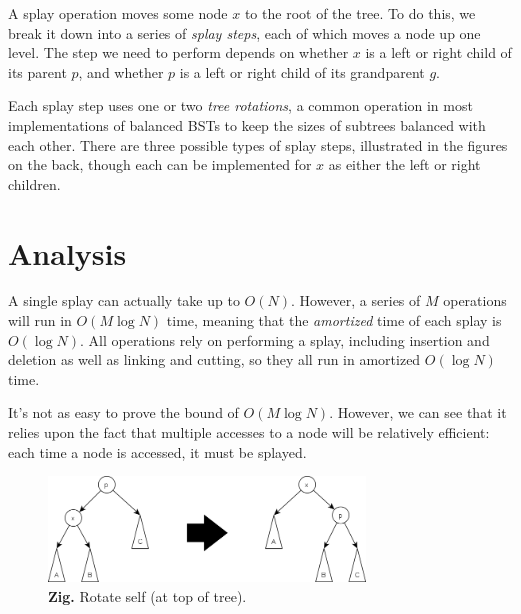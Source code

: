 \documentclass{article}
\begin{document}
A splay operation moves some node $x$ to the root of the tree. To do this, we break it down into a series of \textit{splay steps}, each of which moves a node up one level. The step we need to perform depends on whether $x$ is a left or right child of its parent $p$, and whether $p$ is a left or right child of its grandparent $g$.

Each splay step uses one or two \textit{tree rotations}, a common operation in most implementations of balanced BSTs to keep the sizes of subtrees balanced with each other. There are three possible types of splay steps, illustrated in the figures on the back, though each can be implemented for $x$ as either the left or right children. 

%

\section{Analysis}

A single splay can actually take up to $O(N)$. However, a series of $M$ operations will run in $O(M \log N)$ time, meaning that the \textit{amortized} time of each splay is $O(\log N)$. All operations rely on performing a splay, including insertion and deletion as well as linking and cutting, so they all run in amortized $O(\log N)$ time.

It's not as easy to prove the bound of $O(M \log N)$. However, we can see that it relies upon the fact that multiple accesses to a node will be relatively efficient: each time a node is accessed, it must be splayed.

\begin{figure}
  \center
  \includegraphics[width=0.75\textwidth]{Zig.png}
  \caption{\textbf{Zig.} Rotate self (at top of tree).}
\end{figure}
\end{document}
